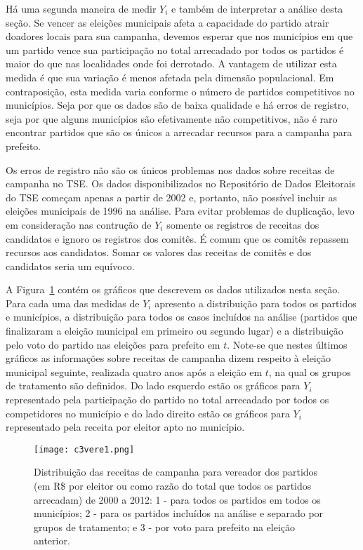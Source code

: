 Há uma segunda maneira de medir $Y_{i}$ e também de interpretar a análise desta seção. Se vencer as eleições municipais afeta a capacidade do partido atrair doadores locais para sua campanha, devemos esperar que nos municípios em que um partido vence sua participação no total arrecadado por todos os partidos é maior do que nas localidades onde foi derrotado. A vantagem de utilizar esta medida é que sua variação é menos afetada pela dimensão populacional. Em contraposição, esta medida varia conforme o número de partidos competitivos no municípios. Seja por que os dados são de baixa qualidade e há erros de registro, seja por que alguns municípios são efetivamente não competitivos, não é raro encontrar partidos que são os únicos a arrecadar recursos para a campanha para prefeito.

Os erros de registro não são os únicos problemas nos dados sobre receitas de campanha no TSE. Os dados disponibilizados no Repositório de Dados Eleitorais do TSE começam apenas a partir de 2002 e, portanto, não possível incluir as eleições municipais de 1996 na análise. Para evitar problemas de duplicação, levo em consideração nas contrução de $Y_{i}$ somente os registros de receitas dos candidatos e ignoro os registros dos comitês. É comum que os comitês repassem recursos aos candidatos. Somar os valores das receitas de comitês e dos candidatos seria um equívoco.

A Figura~\ref{fig:c3vere1} contém os gráficos que descrevem os dados utilizados nesta seção. Para cada uma das medidas de  $Y_{i}$ apresento a distribuição para todos os partidos e municípios, a distribuição para todos os casos incluídos na análise (partidos que finalizaram a eleição municipal em primeiro ou segundo lugar) e a distribuição pelo voto do partido nas eleições para prefeito em $t$. Note-se que nestes últimos gráficos as informações sobre receitas de campanha dizem respeito à eleição municipal seguinte, realizada quatro anos após a eleição em $t$, na qual os grupos de tratamento são definidos. Do lado esquerdo estão os gráficos para $Y_{i}$ representado pela participação do partido no total arrecadado por todos os competidores no município e do lado direito estão os gráficos para $Y_{i}$ representado pela receita por eleitor apto no município.


\begin{figure}[htp]
	\centering
	\texttt{[image: c3vere1.png]}
	\caption{Distribuição das receitas de campanha para vereador dos partidos (em R\$ por eleitor ou como razão do total que todos os partidos arrecadam) de 2000 a 2012: 1 - para todos os partidos em todos os municípios; 2 - para os partidos incluídos na análise e separado por grupos de tratamento; e 3 - por voto para prefeito na eleição anterior.}
	\label{fig:c3vere1}
\end{figure}


